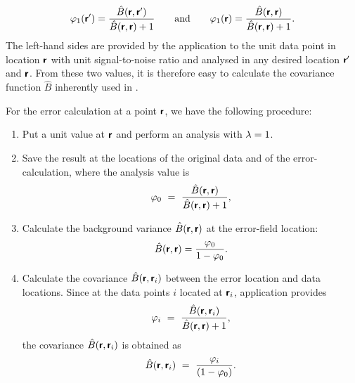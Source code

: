 \begin{equation}
\varphi_1(\vect{r}^\prime) = { \hat{B} (\vect{r},\vect{r}^\prime)\over   \hat{B}(\vect{r},\vect{r}) + 1 } \qquad \textrm{and} \qquad 
\varphi_1(\vect{r}) = { \hat{B} (\vect{r},\vect{r}) \over  \hat{B}(\vect{r},\vect{r}) + 1 }.
\end{equation}
The left-hand sides are provided by the \diva application to the unit data point in location $\vect{r}$ with unit signal-to-noise ratio and analysed in any desired location $\vect{r}^\prime$ and $\vect{r}$. From these two values, it is therefore easy to calculate the covariance function $\hat{B}$ inherently used in \diva.

For the error calculation at a point $\vect{r}$, we have the following procedure: 

\begin{enumerate}

\item Put a unit value at $\vect{r}$ and perform an analysis with $\snr=1$.

\item Save the result at the locations of the original data and of the error-calculation, where the analysis value is
\begin{equation}
\varphi_0 ~=~{ \hat{B} (\vect{r},\vect{r}) \over \hat{B}(\vect{r},\vect{r}) + 1 },
\end{equation}

\item Calculate the background variance $\hat{B}(\vect{r},\vect{r})$ at the error-field location:
\begin{equation}
\hat{B} (\vect{r},\vect{r}) = { \varphi_0 \over 1 - \varphi_0}.
\label{eq:brr}
\end{equation}

\item Calculate the covariance $\hat{B} (\vect{r},\vect{r}_i)$ between the error location and data locations. Since at the data points $i$ located at $\vect{r}_i$, \diva application provides
\begin{equation}
\varphi_i ~=~ { \hat{B} (\vect{r},\vect{r}_i) \over \hat{B}(\vect{r},\vect{r}) + 1 },
\end{equation}
the covariance $\hat{B} (\vect{r},\vect{r}_i)$ is obtained as
\begin{equation}
\hat{B} (\vect{r},\vect{r}_i)~=~{\varphi_i \over ( 1-\varphi_0 )}.
\label{eq:btildco}
\end{equation}

\end{enumerate}

